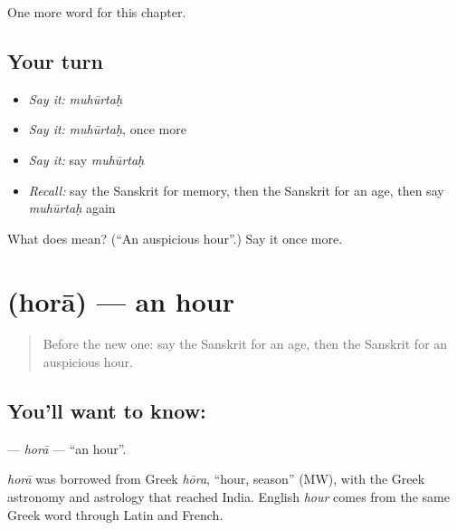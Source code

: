 \begin{grammarlens}[title={What you've built}]
One more word for this chapter.
\end{grammarlens}

\subsection*{Your turn}
\begin{itemize}
\raggedright
  \item \emph{Say it:} \emph{muhūrtaḥ}
  \item \emph{Say it:} \emph{muhūrtaḥ}, once more
  \item \emph{Say it:} say \emph{muhūrtaḥ}
  \item \emph{Recall:} say the Sanskrit for memory, then the Sanskrit for an age, then say \emph{muhūrtaḥ} again
\end{itemize}

\begin{tcolorbox}[breakable,colback=teal!4,colframe=teal!35!black,title={Before you move on}]
What does  mean? (\textquotedblleft{}An auspicious hour\textquotedblright{}.) Say it once more.
\end{tcolorbox}
\section[\texorpdfstring{\sk{होरा} (horā)}{होरा (horā)}]{ (horā) — an hour}

\label{lesson:SA-C183-hora}



\begin{quote}
Before the new one: say the Sanskrit for an age, then the Sanskrit for an auspicious hour.
\end{quote}

\subsection*{You'll want to know: }
\textbf{} — \emph{horā} — \textquotedblleft{}an hour\textquotedblright{}.

\begin{cousinweb}
\emph{horā} was borrowed from Greek \emph{hōra}, \textquotedblleft{}hour, season\textquotedblright{} (MW), with the Greek astronomy and astrology that reached India. English \emph{hour} comes from the same Greek word through Latin and French.
\end{cousinweb}

